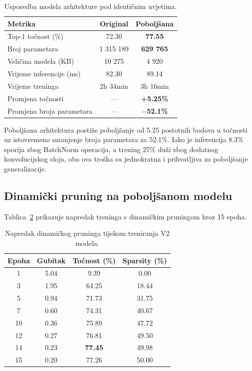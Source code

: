 \documentclass[letterpaper, 10 pt, conference]{ieeeconf}
\begin{document}
\begin{table}[h]
\caption{Usporedba modela arhitekture pod identičnim uvjetima.}
\label{tab:v1_vs_v2}
\begin{center}
\begin{tabular}{lcc}
\toprule
\textbf{Metrika} & \textbf{Original} & \textbf{Poboljšana} \\
\midrule
Top-1 točnost (\%)     & 72.30  & \textbf{77.55} \\
Broj parametara        & 1 315 189 & \textbf{629 765} \\
Veličina modela (KB)   & 10 275  & 4 920 \\
Vrijeme inferencije (ms) & 82.30 & 89.14 \\
Vrijeme treninga       & 2h 34min & 3h 16min \\
\midrule
Promjena točnosti      & --- & \textbf{+5.25\%} \\
Promjena broja parametara & --- & \textbf{$-$52.1\%} \\
\bottomrule
\end{tabular}
\end{center}
\end{table}

Poboljšana arhitektura postiže poboljšanje od 5.25 postotnih bodova u točnosti uz istovremeno smanjenje broja parametara za 52.1\%.
Iako je inferencija 8.3\% sporija zbog BatchNorm operacija, a trening 27\% duži zbog dodatnog konvolucijskog sloja, oba ova troška su jednokratna i prihvatljiva za poboljšanje generalizacije.

\subsection{Dinamički pruning na poboljšanom modelu}

Tablica~\ref{tab:pruning_progress} prikazuje napredak treninga s dinamičkim pruningom kroz 15 epoha.

\begin{table}[h]
\caption{Napredak dinamičkog pruninga tijekom treniranja V2 modela.}
\label{tab:pruning_progress}
\begin{center}
\begin{tabular}{cccc}
\toprule
\textbf{Epoha} & \textbf{Gubitak} & \textbf{Točnost (\%)} & \textbf{Sparsity (\%)} \\
\midrule
1   & 5.04 &  9.39 & 0.00 \\
3   & 1.95 & 64.25 & 18.44 \\
5   & 0.94 & 71.73 & 31.75 \\
7   & 0.60 & 74.31 & 40.67 \\
10  & 0.36 & 75.89 & 47.72 \\
12  & 0.27 & 76.81 & 49.50 \\
14  & 0.23 & \textbf{77.45} & 49.98 \\
15  & 0.20 & 77.26 & 50.00 \\
\bottomrule
\end{tabular}
\end{center}
\end{table}
\end{document}
